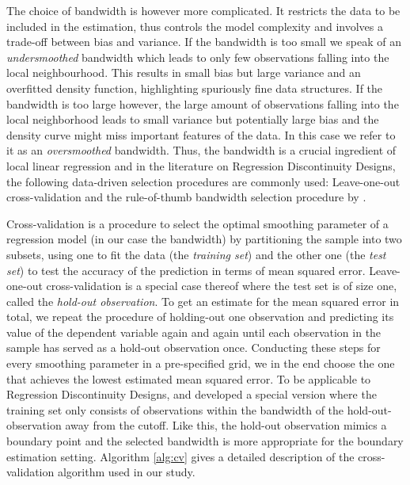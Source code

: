 \documentclass[11pt, a4paper, leqno]{article}
\numberwithin{equation}{section}
\numberwithin{figure}{section}
\numberwithin{table}{section}
\numberwithin{algorithm}{section}
\begin{document}
The choice of bandwidth is however more complicated. It restricts the data to be included in the estimation, thus controls the model complexity and involves a trade-off between bias and variance. If the bandwidth is too small we speak of an \textit{undersmoothed} bandwidth which leads to only few observations falling into the local neighbourhood. This results in small bias but large variance and an overfitted density function, highlighting spuriously fine data structures. If the bandwidth is too large however, the large amount of observations falling into the local neighborhood leads to small variance but potentially large bias and the density curve might miss important features of the data. In this case we refer to it as an \textit{oversmoothed} bandwidth. Thus, the bandwidth is a crucial ingredient of local linear regression and in the literature on Regression Discontinuity Designs, the following data-driven selection procedures are commonly used: Leave-one-out cross-validation and the rule-of-thumb bandwidth selection procedure by \cite{fan_gij}.

Cross-validation is a procedure to select the optimal smoothing parameter of a regression model (in our case the bandwidth) by partitioning the sample into two subsets, using one to fit the data (the \textit{training set}) and the other one (the \textit{test set}) to test the accuracy of the prediction in terms of mean squared error. Leave-one-out cross-validation is a special case thereof where the test set is of size one, called the \textit{hold-out observation}. To get an estimate for the mean squared error in total, we repeat the procedure of holding-out one observation and predicting its value of the dependent variable again and again until each observation in the sample has served as a hold-out observation once. Conducting these steps for every smoothing parameter in a pre-specified grid, we in the end choose the one that achieves the lowest estimated mean squared error. To be applicable to Regression Discontinuity Designs, \cite{imb_lemieux} and \cite{ludwig_miller} developed a special version where the training set only consists of observations within the bandwidth of the hold-out-observation away from the cutoff. Like this, the hold-out observation mimics a boundary point and the selected bandwidth is more appropriate for the boundary estimation setting. Algorithm \ref{alg:cv} gives a detailed description of the cross-validation algorithm used in our study.
\end{document}

